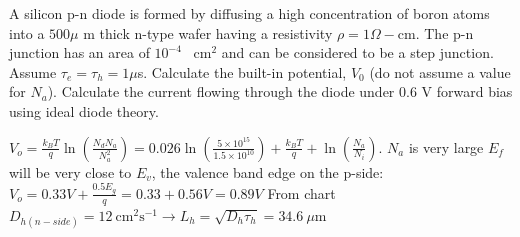 \begin{multicols}{3}
A silicon p-n diode is formed by diffusing a high concentration of boron atoms into a $500 \mu$ m thick n-type wafer having a resistivity $\rho = 1 \Omega -$cm. The p-n junction has an area of $10^{-4}$ \ $\text{cm}^2$ and can be considered to be a step junction. Assume $\tau_e=\tau_h=1 \mu$s. Calculate the built-in potential, $V_0$ (do not assume a value for $N_a$). Calculate the current flowing through the diode under 0.6 V forward bias using ideal diode theory.

$V_o=\frac{k_BT}{q} \ln(\frac{N_dN_a}{N_a^2})=0.026 \ln(\frac{5 \times 10^{15}}{1.5 \times 10^{10}})+\frac{k_BT}{q}+\ln(\frac{N_a}{N_i})$. $N_a$ is very large $E_f$ will be very close to $E_v$, the valence band edge on the p-side: $V_o=0.33 V+ \frac{0.5E_g}{q}=0.33+0.56 V=0.89 V$ \hfill \break
From chart $D_{h(n-side)}=12 \ \text{cm}^2 \text{s}^{-1} \rightarrow L_h=\sqrt{D_h \tau_h}=34.6 \ \mu$m


\end{multicols}
